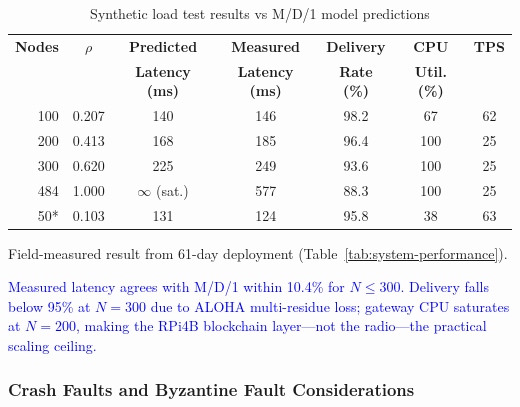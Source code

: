 \documentclass[pdflatex,sn-mathphys-num]{sn-jnl}
\theoremstyle{thmstyleone}
\theoremstyle{thmstyletwo}
\theoremstyle{thmstylethree}
\begin{document}
{\begin{table}[htbp]
\centering
\caption{Synthetic load test results vs M/D/1 model predictions}
\label{tab:load_test}
\footnotesize
\begin{tabular}{r c c c c c c}
\toprule
\textbf{Nodes} & \textbf{$\rho$} & \textbf{Predicted} & \textbf{Measured} & \textbf{Delivery} & \textbf{CPU} & \textbf{TPS} \\
 & & \textbf{Latency (ms)} & \textbf{Latency (ms)} & \textbf{Rate (\%)} & \textbf{Util. (\%)} & \\
\midrule
100  & 0.207 & 140 & 146 & 98.2 & 67 & 62 \\
200  & 0.413 & 168 & 185 & 96.4 & 100 & 25 \\
300  & 0.620 & 225 & 249 & 93.6 & 100 & 25 \\
484  & 1.000 & $\infty$ (sat.) & 577 & 88.3 & 100 & 25 \\
50*  & 0.103   & 131     & 124     & 95.8   & 38      & 63      \\
\bottomrule
\end{tabular}
\vspace{2pt}
\raggedright\footnotesize *Field-measured result from 61-day deployment (Table~\ref{tab:system-performance}).
\end{table}

\textcolor{blue}{Measured latency agrees with M/D/1 within 10.4\% for $N \leq 300$. Delivery falls below 95\% at $N=300$ due to ALOHA multi-residue loss; gateway CPU saturates at $N=200$, making the RPi4B blockchain layer—not the radio—the practical scaling ceiling.}

\subsubsection{Crash Faults and Byzantine Fault Considerations}
\label{subsubsec:byzantine}

}
\end{document}
